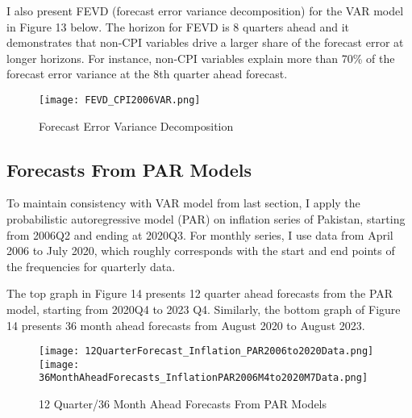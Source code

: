 \documentclass[12pt]{article}
\newcommand{\1}{\mathbbm 1}
\begin{document}
	
	I also present FEVD (forecast error variance decomposition) for the VAR model in Figure 13 below. The horizon for FEVD is 8 quarters ahead and it demonstrates that non-CPI variables drive a larger share of the forecast error at longer horizons. For instance, non-CPI variables explain more than 70\% of the forecast error variance at the 8th quarter ahead forecast.
	
	
		
		\begin{figure}[H]
			\begin{Center}
				\texttt{[image: FEVD\_CPI2006VAR.png]}
				\caption{Forecast Error Variance Decomposition}
			\end{Center}
		\end{figure}
		
		
		\subsection{Forecasts From PAR Models}
		
		To maintain consistency with VAR model from last section, I apply the probabilistic autoregressive model (PAR) on inflation series of Pakistan, starting from 2006Q2 and ending at 2020Q3. For monthly series, I use data from April 2006 to July 2020, which roughly corresponds with the start and end points of the frequencies for quarterly data.
		
		The top graph in Figure 14 presents 12 quarter ahead forecasts from the PAR model, starting from 2020Q4 to 2023 Q4. Similarly, the bottom graph of Figure 14 presents 36 month ahead forecasts from August 2020 to August 2023. 
		
			\begin{figure}[H]
			\begin{Center}
				\texttt{[image: 12QuarterForecast\_Inflation\_PAR2006to2020Data.png]}
				\texttt{[image: 36MonthAheadForecasts\_InflationPAR2006M4to2020M7Data.png]}
				\caption{12 Quarter/36 Month Ahead Forecasts From PAR Models}
			\end{Center}
		\end{figure}
		
		
		
		
		
		
		
		
		
\end{document}
